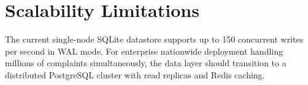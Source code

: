 \section{Scalability Limitations}
The current single-node SQLite datastore supports up to 150 concurrent writes per second in WAL mode. For enterprise nationwide deployment handling millions of complaints simultaneously, the data layer should transition to a distributed PostgreSQL cluster with read replicas and Redis caching.
